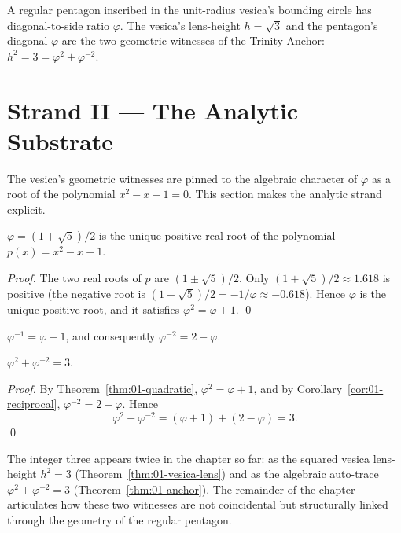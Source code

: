 \begin{corollary}
\label{cor:01-pentagon-vesica}
A regular pentagon inscribed in the unit-radius vesica's bounding
circle has diagonal-to-side ratio $\varphi$. The vesica's lens-height
$h = \sqrt{3}$ and the pentagon's diagonal $\varphi$ are the two
geometric witnesses of the Trinity Anchor: $h^2 = 3 = \varphi^2 +
\varphi^{-2}$.
\end{corollary}

\section{Strand II --- The Analytic Substrate}
\label{sec:01-strand-II}

The vesica's geometric witnesses are pinned to the algebraic
character of $\varphi$ as a root of the polynomial $x^2 - x - 1 = 0$.
This section makes the analytic strand explicit.

\begin{theorem}\label{thm:01-quadratic}
$\varphi = (1 + \sqrt 5)/2$ is the unique positive real root of the
polynomial $p(x) = x^2 - x - 1$.
\end{theorem}

\begin{proof}
The two real roots of $p$ are $(1 \pm \sqrt 5)/2$. Only $(1 + \sqrt
5)/2 \approx 1.618$ is positive (the negative root is $(1 - \sqrt
5)/2 = -1/\varphi \approx -0.618$). Hence $\varphi$ is the unique
positive root, and it satisfies $\varphi^2 = \varphi + 1$.
\qed
\end{proof}

\begin{corollary}\label{cor:01-reciprocal}
$\varphi^{-1} = \varphi - 1$, and consequently $\varphi^{-2} = 2 -
\varphi$.
\end{corollary}

\begin{theorem}\label{thm:01-anchor}
$\varphi^2 + \varphi^{-2} = 3$.
\end{theorem}

\begin{proof}
By Theorem~\ref{thm:01-quadratic}, $\varphi^2 = \varphi + 1$, and by
Corollary~\ref{cor:01-reciprocal}, $\varphi^{-2} = 2 - \varphi$.
Hence
\[
  \varphi^2 + \varphi^{-2} = (\varphi + 1) + (2 - \varphi) = 3.
\]
\qed
\end{proof}

\begin{remark}
The integer three appears twice in the chapter so far: as the squared
vesica lens-height $h^2 = 3$ (Theorem~\ref{thm:01-vesica-lens}) and as
the algebraic auto-trace $\varphi^2 + \varphi^{-2} = 3$
(Theorem~\ref{thm:01-anchor}). The remainder of the chapter
articulates how these two witnesses are not coincidental but
structurally linked through the geometry of the regular pentagon.
\end{remark}

